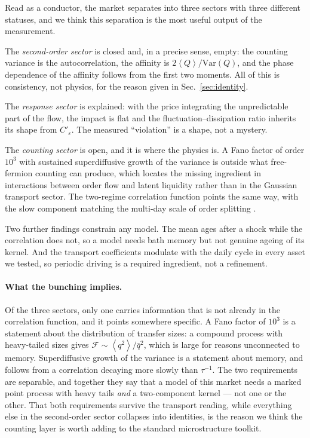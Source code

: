 \documentclass[aps,pre,twocolumn,superscriptaddress,floatfix,nofootinbib]{revtex4-2}
\newcommand{\eps}{\varepsilon}
\newcommand{\avg}[1]{\left\langle #1 \right\rangle}
\newcommand{\Var}{\mathrm{Var}}
\begin{document}
Read as a conductor, the market separates into three sectors with three
different statuses, and we think this separation is the most useful output of
the measurement.

The \emph{second-order sector} is closed and, in a precise sense, empty: the
counting variance is the autocorrelation, the affinity is
$2\avg{Q}/\Var(Q)$, and the phase dependence of the affinity follows from the
first two moments. All of this is consistency, not physics, for the reason given
in Sec.~\ref{sec:identity}.

The \emph{response sector} is explained: with the price integrating the
unpredictable part of the flow, the impact is flat and the
fluctuation--dissipation ratio inherits its shape from $C'_\eps$. The measured
``violation'' is a shape, not a mystery.

The \emph{counting sector} is open, and it is where the physics is. A Fano
factor of order $10^3$ with sustained superdiffusive growth of the variance is
outside what free-fermion counting can produce, which locates the missing
ingredient in interactions between order flow and latent liquidity rather than
in the Gaussian transport sector. The two-regime correlation function points the
same way, with the slow component matching the multi-day scale of order
splitting \cite{lillo2005,sato2023prl}.

Two further findings constrain any model. The mean ages after a shock while the
correlation does not, so a model needs bath memory but not genuine ageing of its
kernel. And the transport coefficients modulate with the daily cycle in every
asset we tested, so periodic driving is a required ingredient, not a refinement.

\paragraph*{What the bunching implies.}
Of the three sectors, only one carries information that is not already in the
correlation function, and it points somewhere specific. A Fano factor of
$10^{3}$ is a statement about the distribution of transfer sizes: a compound
process with heavy-tailed sizes gives $\mathcal{F}\sim\avg{q^{2}}/\bar q^{2}$,
which is large for reasons unconnected to memory. Superdiffusive growth of the
variance is a statement about memory, and follows from a correlation decaying
more slowly than $\tau^{-1}$. The two requirements are separable, and together
they say that a model of this market needs a marked point process with heavy
tails \emph{and} a two-component kernel --- not one or the other. That both
requirements survive the transport reading, while everything else in the
second-order sector collapses into identities, is the reason we think the
counting layer is worth adding to the standard microstructure toolkit.
\end{document}
